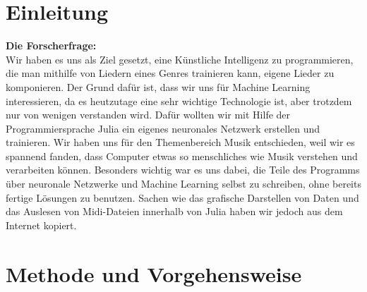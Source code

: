\documentclass[11pt, a4paper, ngerman]{article}
\begin{document}
\section{Einleitung} \label{Einleitung}
\textbf{Die Forscherfrage:}\\[1ex]
Wir haben es uns als Ziel gesetzt, eine Künstliche Intelligenz zu programmieren, die man mithilfe von Liedern eines Genres trainieren kann, eigene Lieder zu komponieren. Der Grund dafür ist, dass wir uns für Machine Learning interessieren, da es heutzutage eine sehr wichtige Technologie ist, aber trotzdem nur von wenigen verstanden wird. Dafür wollten wir mit Hilfe der Programmiersprache Julia ein eigenes neuronales Netzwerk erstellen und trainieren. Wir haben uns für den Themenbereich Musik entschieden, weil wir es spannend fanden, dass Computer etwas so menschliches wie Musik verstehen und verarbeiten können. Besonders wichtig war es uns dabei, die Teile des Programms über neuronale Netzwerke und Machine Learning selbst zu schreiben, ohne bereits fertige Lösungen zu benutzen. Sachen wie das grafische Darstellen von Daten und das Auslesen von Midi-Dateien innerhalb von Julia haben wir jedoch aus dem Internet kopiert.

\section{Methode und Vorgehensweise} \label{Methode und Vorgehensweise}
\end{document}
